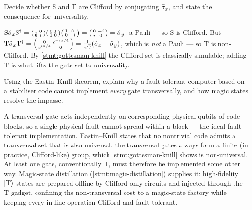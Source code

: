 \begin{exercise}
Decide whether $\mathrm{S}$ and $\mathrm{T}$ are Clifford by conjugating
$\hat\sigma_x$, and state the consequence for universality.
\begin{solution}
$\mathrm{S}\hat\sigma_x\mathrm{S}^\dagger
=\begin{psmallmatrix}1&0\\0&i\end{psmallmatrix}
\begin{psmallmatrix}0&1\\1&0\end{psmallmatrix}
\begin{psmallmatrix}1&0\\0&-i\end{psmallmatrix}
=\begin{psmallmatrix}0&-i\\i&0\end{psmallmatrix}=\hat\sigma_y$, a Pauli
--- so $\mathrm{S}$ is Clifford. But
$\mathrm{T}\hat\sigma_x\mathrm{T}^\dagger
=\begin{psmallmatrix}0&e^{-i\pi/4}\\e^{i\pi/4}&0\end{psmallmatrix}
=\tfrac{1}{\sqrt2}(\hat\sigma_x+\hat\sigma_y)$, which is \emph{not} a
Pauli --- so $\mathrm{T}$ is non-Clifford. By
\cref{stmt:gottesman-knill} the Clifford set is classically simulable;
adding $\mathrm{T}$ is what lifts the gate set to universality.
\end{solution}
\end{exercise}

\begin{exercise}
Using the Eastin--Knill theorem, explain why a fault-tolerant computer
based on a stabiliser code cannot implement \emph{every} gate
transversally, and how magic states resolve the impasse.
\begin{solution}
A transversal gate acts independently on corresponding physical qubits
of code blocks, so a single physical fault cannot spread within a block
--- the ideal fault-tolerant implementation. Eastin--Knill states that
no nontrivial code admits a transversal set that is also universal: the
transversal gates always form a finite (in practice, Clifford-like)
group, which \cref{stmt:gottesman-knill} shows is non-universal. At
least one gate, conventionally $\mathrm{T}$, must therefore be
implemented some other way. Magic-state distillation
(\cref{stmt:magic-distillation}) supplies it: high-fidelity
$\ket{\mathrm{T}}$ states are prepared offline by Clifford-only circuits
and injected through the $\mathrm{T}$ gadget, confining the
non-transversal cost to a magic-state factory while keeping every
in-line operation Clifford and fault-tolerant.
\end{solution}
\end{exercise}
